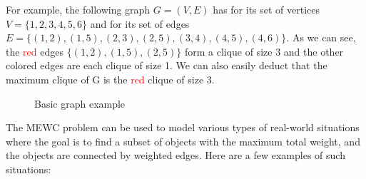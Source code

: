 \begin{minipage}{\linewidth}
    \begin{minipage}{0.5\linewidth}
        For example, the following graph $G=(V,E)$ has for its set of vertices
        $V=\{1,2,3,4,5,6\}$ and for its set of edges
        $E=\{(1,2),(1,5),(2,3),(2,5),(3,4),(4,5),(4,6)\}$.
        As we can see, the \textcolor{red}{red} edges $\{(1,2),(1,5),(2,5)\}$ form a
        clique of size 3 and the other colored edges are each clique of size 1.
        We can also easily deduct that the maximum clique of G is the
        \textcolor{red}{red} clique of size 3.
    \end{minipage}
    \hspace{0.05\linewidth}
    \begin{minipage}{0.4\linewidth}
        \begin{figure}[H]
            \centering
            \caption{Basic graph example}
            \label{fig:basic-graph-example}
        \end{figure}
    \end{minipage}
\end{minipage} \bigskip

The MEWC problem can be used to model various types of real-world situations where
the goal is to find a subset of objects with the maximum total weight, and the
objects are connected by weighted edges. Here are a few examples of such situations:

